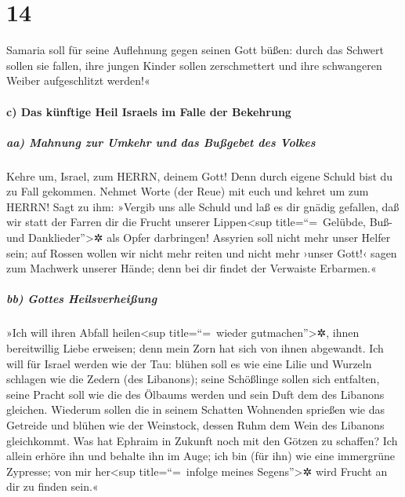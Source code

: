 \hypertarget{section-13}{%
\section{14}\label{section-13}}

 Samaria soll für seine Auflehnung gegen seinen Gott
büßen: durch das Schwert sollen sie fallen, ihre jungen Kinder sollen
zerschmettert und ihre schwangeren Weiber aufgeschlitzt werden!«

\hypertarget{c-das-kuxfcnftige-heil-israels-im-falle-der-bekehrung}{%
\paragraph{c) Das künftige Heil Israels im Falle der
Bekehrung}\label{c-das-kuxfcnftige-heil-israels-im-falle-der-bekehrung}}

\hypertarget{aa-mahnung-zur-umkehr-und-das-buuxdfgebet-des-volkes}{%
\subparagraph{aa) Mahnung zur Umkehr und das Bußgebet des
Volkes}\label{aa-mahnung-zur-umkehr-und-das-buuxdfgebet-des-volkes}}

 Kehre um, Israel, zum HERRN, deinem Gott! Denn durch
eigene Schuld bist du zu Fall gekommen.  Nehmet Worte (der
Reue) mit euch und kehret um zum HERRN! Sagt zu ihm: »Vergib uns alle
Schuld und laß es dir gnädig gefallen, daß wir statt der Farren dir die
Frucht unserer Lippen\textless sup title=``=~Gelübde, Buß- und
Danklieder''\textgreater✲ als Opfer darbringen!  Assyrien
soll nicht mehr unser Helfer sein; auf Rossen wollen wir nicht mehr
reiten und nicht mehr ›unser Gott!‹ sagen zum Machwerk unserer Hände;
denn bei dir findet der Verwaiste Erbarmen.«

\hypertarget{bb-gottes-heilsverheiuxdfung}{%
\subparagraph{bb) Gottes
Heilsverheißung}\label{bb-gottes-heilsverheiuxdfung}}

 »Ich will ihren Abfall heilen\textless sup
title=``=~wieder gutmachen''\textgreater✲, ihnen bereitwillig Liebe
erweisen; denn mein Zorn hat sich von ihnen abgewandt. 
Ich will für Israel werden wie der Tau: blühen soll es wie eine Lilie
und Wurzeln schlagen wie die Zedern (des Libanons);  seine
Schößlinge sollen sich entfalten, seine Pracht soll wie die des Ölbaums
werden und sein Duft dem des Libanons gleichen.  Wiederum
sollen die in seinem Schatten Wohnenden sprießen wie das Getreide und
blühen wie der Weinstock, dessen Ruhm dem Wein des Libanons gleichkommt.
 Was hat Ephraim in Zukunft noch mit den Götzen zu
schaffen? Ich allein erhöre ihn und behalte ihn im Auge; ich bin (für
ihn) wie eine immergrüne Zypresse; von mir her\textless sup
title=``=~infolge meines Segens''\textgreater✲ wird Frucht an dir zu
finden sein.«

